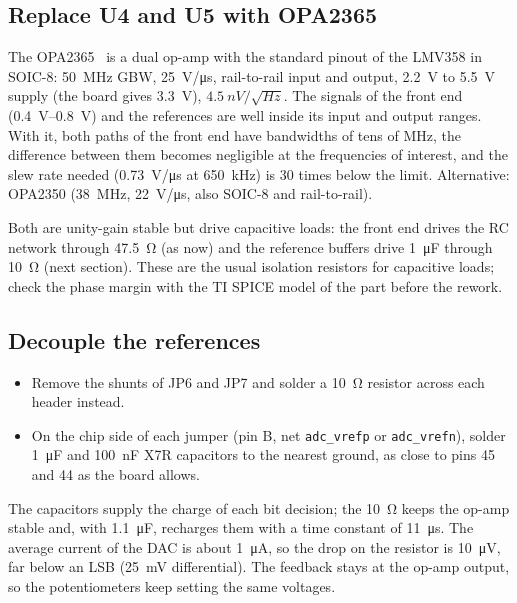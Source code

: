 \documentclass[10pt,a4paper]{article}
\begin{document}
\subsection{Replace U4 and U5 with OPA2365}
The OPA2365~\cite{opa365} is a dual op-amp with the standard pinout of the LMV358 in SOIC-8:
\SI{50}{MHz} GBW, \SI{25}{V/\micro s}, rail-to-rail input and output, \SI{2.2}{V} to \SI{5.5}{V}
supply (the board gives \SI{3.3}{V}), $\SI{4.5}{nV}/\sqrt{\si{Hz}}$. The signals of the front end
(\SIrange{0.4}{0.8}{V}) and the references are well inside its input and output ranges. With it,
both paths of the front end have bandwidths of tens of MHz, the difference between them becomes
negligible at the frequencies of interest, and the slew rate needed (\SI{0.73}{V/\micro s} at
\SI{650}{kHz}) is 30 times below the limit. Alternative: OPA2350 (\SI{38}{MHz},
\SI{22}{V/\micro s}, also SOIC-8 and rail-to-rail).

Both are unity-gain stable but drive capacitive loads: the front end drives the RC network
through \SI{47.5}{\ohm} (as now) and the reference buffers drive \SI{1}{\micro F} through
\SI{10}{\ohm} (next section). These are the usual isolation resistors for capacitive loads; check
the phase margin with the TI SPICE model of the part before the rework.

\subsection{Decouple the references}
\begin{itemize}
  \item Remove the shunts of JP6 and JP7 and solder a \SI{10}{\ohm} resistor across each header
        instead.
  \item On the chip side of each jumper (pin B, net \texttt{adc\_vrefp} or \texttt{adc\_vrefn}),
        solder \SI{1}{\micro F} and \SI{100}{nF} X7R capacitors to the nearest ground, as close to
        pins 45 and 44 as the board allows.
\end{itemize}
The capacitors supply the charge of each bit decision; the \SI{10}{\ohm} keeps the op-amp stable
and, with \SI{1.1}{\micro F}, recharges them with a time constant of \SI{11}{\micro s}. The
average current of the DAC is about \SI{1}{\micro A}, so the drop on the resistor is
\SI{10}{\micro V}, far below an LSB (\SI{25}{mV} differential). The feedback stays at the op-amp
output, so the potentiometers keep setting the same voltages.
\end{document}
